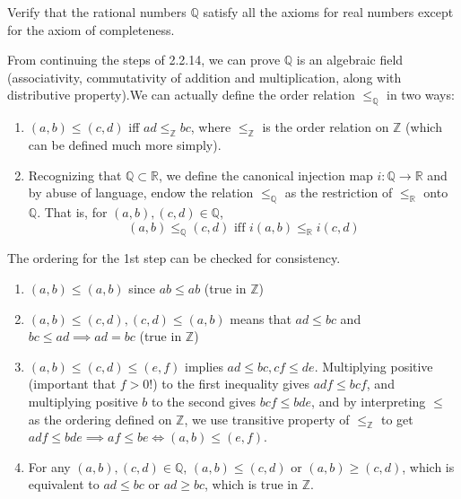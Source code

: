   \begin{exercise}[Zorich 2.2.13]
    Verify that the rational numbers $\mathbb{Q}$ satisfy all the axioms for real numbers except for the axiom of completeness. 
  \end{exercise}
  \begin{solution}
    From continuing the steps of 2.2.14, we can prove $\mathbb{Q}$ is an algebraic field (associativity, commutativity of addition and multiplication, along with distributive property).We can actually define the order relation $\leq_\mathbb{Q}$ in two ways: 
    \begin{enumerate}
      \item $(a, b) \leq (c, d)$ iff $ad \leq_{\mathbb{Z}} bc$, where $\leq_{\mathbb{Z}}$ is the order relation on $\mathbb{Z}$ (which can be defined much more simply). 
      \item Recognizing that $\mathbb{Q} \subset \mathbb{R}$, we define the canonical injection map $i: \mathbb{Q} \longrightarrow \mathbb{R}$ and by abuse of language, endow the relation $\leq_{\mathbb{Q}}$ as the restriction of $\leq_{\mathbb{R}}$ onto $\mathbb{Q}$. That is, for $(a, b), (c, d) \in \mathbb{Q}$, 
      \begin{equation}
        (a, b) \leq_{\mathbb{Q}} (c, d) \text{ iff } i(a, b) \leq_{\mathbb{R}} i(c, d)
      \end{equation}
    \end{enumerate}
    The ordering for the 1st step can be checked for consistency. 
    \begin{enumerate}
      \item $(a, b) \leq (a, b)$ since $ab \leq ab$ (true in $\mathbb{Z}$) 
      \item $(a, b) \leq (c, d), (c, d) \leq (a, b)$ means that $ad \leq bc$ and $bc \leq ad \implies ad = bc$ (true in $\mathbb{Z}$) 
      \item $(a, b) \leq (c, d) \leq (e, f)$ implies $ad \leq bc, cf \leq de$. Multiplying positive (important that $f >0$!) to the first inequality gives $adf \leq bcf$, and multiplying positive $b$ to the second gives $bcf \leq bde$, and by interpreting $\leq$ as the ordering defined on $\mathbb{Z}$, we use transitive property of $\leq_\mathbb{Z}$ to get $adf \leq bde \implies af \leq be \iff (a, b) \leq (e, f)$. 
      \item For any $(a, b), (c, d) \in \mathbb{Q}$, $(a, b) \leq (c, d)$ or $(a, b) \geq (c, d)$, which is equivalent to $ad \leq bc$ or $ad \geq bc$, which is true in $\mathbb{Z}$. 
    \end{enumerate}

\end{solution}
